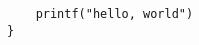 \documentclass{article}
\begin{document}
 
\begin{verbatim} 
    printf("hello, world")
}
\end{verbatim} 
\end{document}
